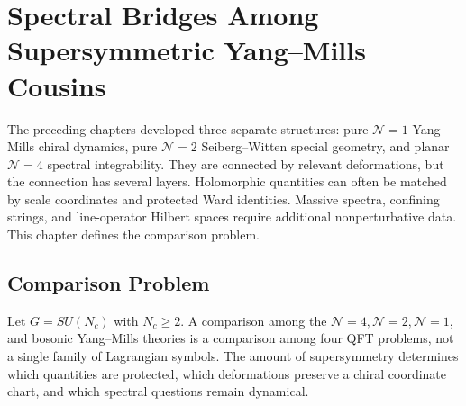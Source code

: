 \chapter{Spectral Bridges Among Supersymmetric Yang--Mills Cousins}
\label{ch:susy-yang-mills-family-spectra}

\ConventionsLorentzian

The preceding chapters developed three separate structures: pure
\(\mathcal N=1\) Yang--Mills chiral dynamics, pure \(\mathcal N=2\)
Seiberg--Witten special geometry, and planar \(\mathcal N=4\) spectral
integrability.  They are connected by relevant deformations, but the
connection has several layers.  Holomorphic quantities can often be matched
by scale coordinates and protected Ward identities.  Massive spectra,
confining strings, and line-operator Hilbert spaces require additional
nonperturbative data.  This chapter defines the comparison problem.

\section{Comparison Problem}
\label{sec:susy-ym-family-comparison-problem}

Let \(G=SU(N_c)\) with \(N_c\ge2\).  A comparison among the
\(\mathcal N=4,\mathcal N=2,\mathcal N=1\), and bosonic Yang--Mills theories
is a comparison among four QFT problems, not a single family of Lagrangian
symbols.  The amount of supersymmetry determines which quantities are
protected, which deformations preserve a chiral coordinate chart, and which
spectral questions remain dynamical.

